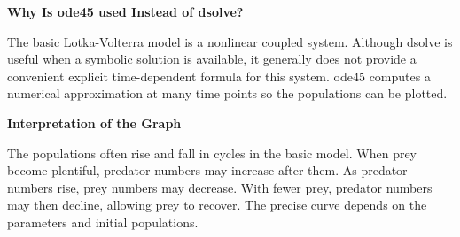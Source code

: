 \documentclass{article}
\begin{document}
\vspace{1em}
\noindent
\textbf{Why Is ode45 used Instead of dsolve?}

\noindent
The basic Lotka-Volterra model is a nonlinear coupled system. Although dsolve is useful when a symbolic solution is available, it generally does not provide a convenient explicit time-dependent formula for this system. ode45 computes a numerical approximation at many time points so the populations can be plotted.

\vspace{1em}
\noindent
\textbf{Interpretation of the Graph}

\noindent
The populations often rise and fall in cycles in the basic model. When prey become plentiful, predator numbers may increase after them. As predator numbers rise, prey numbers may decrease. With fewer prey, predator numbers may then decline, allowing prey to recover. The precise curve depends on the parameters and initial populations.
\end{document}
